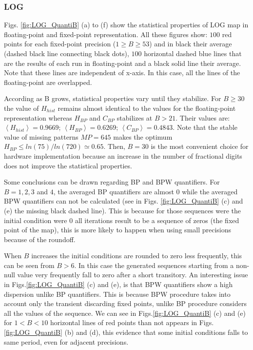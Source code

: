 \subsubsection{LOG} \label{subsubsec:log}

Figs. \ref{fig:LOG_QuantiB} (a) to (f) show the statistical properties of LOG map in floating-point and fixed-point representation.
All these figures show: $100$ red points for each fixed-point precision ($1\geq B \geq 53$) and in black their average (dashed black line connecting black dots), $100$ horizontal dashed blue lines that are the results of each run in floating-point and a black solid line their average.
Note that these lines are independent of x-axis.
In this case, all the lines of the floating-point are overlapped.

According as B grows, statistical properties vary until they stabilize.
For $B\geq 30$ the value of $H_{hist}$ remains almost identical to the values for the floating-point representation whereas $H_{BP}$ and $C_{BP}$ stabilizes at $B>21$.
Their values are: $\left\langle H_{hist}\right\rangle =0.9669$; $\left\langle H_{BP}\right\rangle =0.6269$; $\left\langle C_{BP}\right\rangle=0.4843$.
Note that the stable value of missing patterns $MP=645$ makes the optimum $H_{BP} \leq ln(75)/ln(720) \simeq 0.65$.
Then, $B=30$ is the most convenient choice for hardware implementation because an increase in the number of fractional digits does not improve the statistical properties.

Some conclusions can be drawn regarding BP and BPW quantifiers.
For $B=1, 2, 3$ and $4$, the averaged BP quantifiers are almost $0$ while the averaged BPW quantifiers can not be calculated (see in Figs. \ref{fig:LOG_QuantiB} (c) and (e) the missing black dashed line).
This is because for those sequences were the initial condition were $0$ all iterations result to be a sequence of zeros (the fixed point of the map), this is more likely to happen when using small precisions because of the roundoff.

When $B$ increases the initial conditions are rounded to zero less frequently, this can be seen from $B>6$.
In this case the generated sequences starting from a non-null value very frequently fall to zero after a short transitory.
An interesting issue in Figs.\ref{fig:LOG_QuantiB} (c) and (e), is that BPW quantifiers show a high dispersion unlike BP quantifiers.
This is because BPW procedure takes into account only the transient discarding fixed points, unlike BP procedure considers all the values of the sequence.
We can see in Figs.\ref{fig:LOG_QuantiB} (c) and (e) for $1<B<10$ horizontal lines of red points than not appears in Figs.\ref{fig:LOG_QuantiB} (b) and (d), this evidence that some initial conditions falls to same period, even for adjacent precisions.

